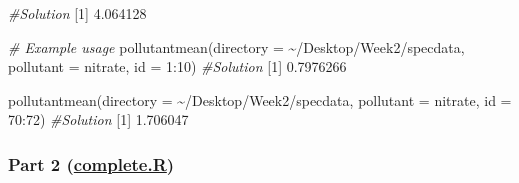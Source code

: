\documentclass[
]{article}
\newenvironment{Shaded}{\begin{snugshade}}{\end{snugshade}}
\newcommand{\AttributeTok}[1]{\textcolor[rgb]{0.77,0.63,0.00}{#1}}
\newcommand{\CommentTok}[1]{\textcolor[rgb]{0.56,0.35,0.01}{\textit{#1}}}
\newcommand{\DecValTok}[1]{\textcolor[rgb]{0.00,0.00,0.81}{#1}}
\newcommand{\FloatTok}[1]{\textcolor[rgb]{0.00,0.00,0.81}{#1}}
\newcommand{\FunctionTok}[1]{\textcolor[rgb]{0.00,0.00,0.00}{#1}}
\newcommand{\NormalTok}[1]{#1}
\newcommand{\SpecialCharTok}[1]{\textcolor[rgb]{0.00,0.00,0.00}{#1}}
\newcommand{\StringTok}[1]{\textcolor[rgb]{0.31,0.60,0.02}{#1}}
\begin{document}
\begin{Shaded}
\begin{Highlighting}[]
\CommentTok{\#Solution}
\NormalTok{[}\DecValTok{1}\NormalTok{] }\FloatTok{4.064128}

\CommentTok{\# Example usage}
\FunctionTok{pollutantmean}\NormalTok{(}\AttributeTok{directory =} \StringTok{\textquotesingle{}\textasciitilde{}/Desktop/Week2/specdata\textquotesingle{}}\NormalTok{, }\AttributeTok{pollutant =} \StringTok{\textquotesingle{}nitrate\textquotesingle{}}\NormalTok{, }\AttributeTok{id =} \DecValTok{1}\SpecialCharTok{:}\DecValTok{10}\NormalTok{)}
\CommentTok{\#Solution}
\NormalTok{[}\DecValTok{1}\NormalTok{] }\FloatTok{0.7976266}

\FunctionTok{pollutantmean}\NormalTok{(}\AttributeTok{directory =} \StringTok{\textquotesingle{}\textasciitilde{}/Desktop/Week2/specdata\textquotesingle{}}\NormalTok{, }\AttributeTok{pollutant =} \StringTok{\textquotesingle{}nitrate\textquotesingle{}}\NormalTok{, }\AttributeTok{id =} \DecValTok{70}\SpecialCharTok{:}\DecValTok{72}\NormalTok{)}
\CommentTok{\#Solution}
\NormalTok{[}\DecValTok{1}\NormalTok{] }\FloatTok{1.706047}
\end{Highlighting}
\end{Shaded}

\hypertarget{part-2-complete.r}{%
\subsubsection{\texorpdfstring{Part 2
(\href{https://github.com/kpnaga08/datasciencecoursera/blob/master/R\%20Programming/Project\textquotesingle{}\%20Assignment/Projects/complete.R}{complete.R})}{Part 2 (complete.R)}}\label{part-2-complete.r}}
\end{document}
